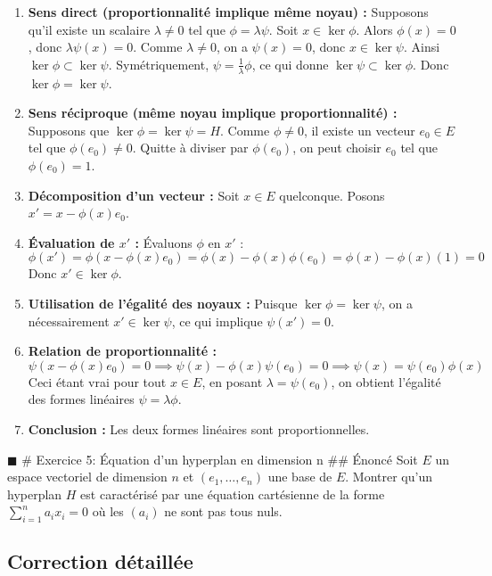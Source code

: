 \begin{enumerate}
\def\labelenumi{\arabic{enumi}.}
\tightlist
\item
  \textbf{Sens direct (proportionnalité implique même noyau) :}
  Supposons qu'il existe un scalaire \(\lambda \neq 0\) tel que
  \(\phi = \lambda \psi\). Soit \(x \in \ker \phi\). Alors
  \(\phi(x) = 0\), donc \(\lambda \psi(x) = 0\). Comme
  \(\lambda \neq 0\), on a \(\psi(x) = 0\), donc \(x \in \ker \psi\).
  Ainsi \(\ker \phi \subset \ker \psi\). Symétriquement,
  \(\psi = \frac{1}{\lambda} \phi\), ce qui donne
  \(\ker \psi \subset \ker \phi\). Donc \(\ker \phi = \ker \psi\).
\item
  \textbf{Sens réciproque (même noyau implique proportionnalité) :}
  Supposons que \(\ker \phi = \ker \psi = H\). Comme \(\phi \neq 0\), il
  existe un vecteur \(e_0 \in E\) tel que \(\phi(e_0) \neq 0\). Quitte à
  diviser par \(\phi(e_0)\), on peut choisir \(e_0\) tel que
  \(\phi(e_0) = 1\).
\item
  \textbf{Décomposition d'un vecteur :} Soit \(x \in E\) quelconque.
  Posons \(x' = x - \phi(x)e_0\).
\item
  \textbf{Évaluation de \(x'\) :} Évaluons \(\phi\) en \(x'\) :
  \[\phi(x') = \phi(x - \phi(x)e_0) = \phi(x) - \phi(x)\phi(e_0) = \phi(x) - \phi(x)(1) = 0\]
  Donc \(x' \in \ker \phi\).
\item
  \textbf{Utilisation de l'égalité des noyaux :} Puisque
  \(\ker \phi = \ker \psi\), on a nécessairement \(x' \in \ker \psi\),
  ce qui implique \(\psi(x') = 0\).
\item
  \textbf{Relation de proportionnalité :}
  \[\psi(x - \phi(x)e_0) = 0 \implies \psi(x) - \phi(x)\psi(e_0) = 0 \implies \psi(x) = \psi(e_0)\phi(x)\]
  Ceci étant vrai pour tout \(x \in E\), en posant
  \(\lambda = \psi(e_0)\), on obtient l'égalité des formes linéaires
  \(\psi = \lambda \phi\).
\item
  \textbf{Conclusion :} Les deux formes linéaires sont proportionnelles.
\end{enumerate}

\(\blacksquare\) \# Exercice 5: Équation d'un hyperplan en dimension n
\#\# Énoncé Soit \(E\) un espace vectoriel de dimension \(n\) et
\((e_1, \dots, e_n)\) une base de \(E\). Montrer qu'un hyperplan \(H\)
est caractérisé par une équation cartésienne de la forme
\(\sum_{i=1}^n a_i x_i = 0\) où les \((a_i)\) ne sont pas tous nuls.

\hypertarget{correction-duxe9tailluxe9e-4}{%
\subsection{Correction détaillée}\label{correction-duxe9tailluxe9e-4}}

